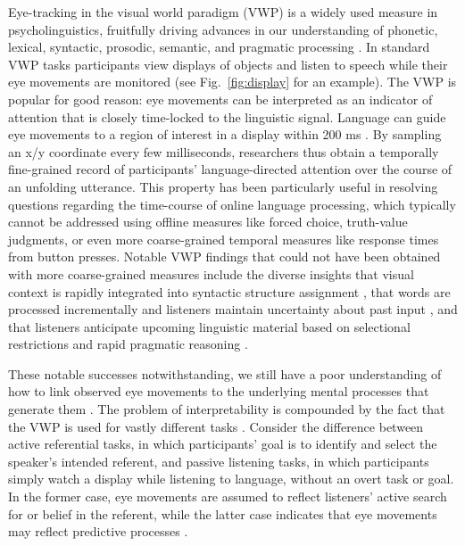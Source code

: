 \documentclass[10pt,letterpaper]{article}
\newcommand{\figref}[1]{Fig.~\ref{#1}}
\begin{document}
Eye-tracking in the visual world paradigm (VWP) is a widely used measure in psycholinguistics, fruitfully driving advances in our understanding of phonetic, lexical, syntactic, prosodic, semantic, and pragmatic processing  \cite{tanenhaus1995,Allopenna1998,altmann1999,clayards2008,SedivyEtAl1999:Achieving-Incremental-Semantic-,huang2009,kurumada2014}. %
In standard VWP tasks participants view displays of objects and listen to speech while their eye movements are monitored (see \figref{fig:display} for an example). The VWP is popular for good reason: eye movements can be interpreted as an indicator of attention that is closely time-locked to the linguistic signal. Language can guide eye movements to a region of interest in a display within 200 ms \cite{Allopenna1998}. By sampling an x/y coordinate every few milliseconds, researchers thus obtain a temporally fine-grained record of participants' language-directed attention over the course of an unfolding utterance. This property has been particularly useful in resolving questions regarding the time-course of online language processing, which typically cannot be addressed using offline measures like forced choice, truth-value judgments, or even more coarse-grained temporal measures like response times from button presses. Notable VWP findings that could not have been obtained with more coarse-grained measures include the diverse insights that visual context is rapidly integrated into syntactic structure assignment \cite{tanenhaus1995}, %
that words are processed incrementally and listeners maintain uncertainty about past input \cite{Allopenna1998,clayards2008}, and that listeners anticipate upcoming linguistic material based on selectional restrictions and rapid pragmatic reasoning \cite{altmann1999,SedivyEtAl1999:Achieving-Incremental-Semantic-}. 


These notable successes notwithstanding, we still have a  poor understanding of how to link observed eye movements to the underlying mental processes that generate them \cite{SalverdaTanenhaus2017:The-Visual-World-Paradigm, tanenhaus2000eye, Allopenna1998, magnuson2019fixations}. The problem of interpretability  is compounded by the fact that the VWP is used for vastly different tasks \cite<for an overview, see>{Huettig2011}. Consider  the difference between active referential tasks, in which participants' goal is to identify and select the speaker's intended referent, and passive listening tasks, in which participants simply watch a display while listening to language, without an overt task or goal. In the former case, eye movements are assumed to reflect listeners' active search for or belief in the referent, while the latter case indicates that eye movements may  reflect predictive processes \cite{altmann1999}. %
\end{document}
